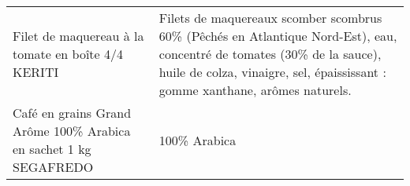 \begin{longtable}{p{5cm}p{10cm}}
                                                       Filet de maquereau à la tomate en boîte 4/4 KERITI &                                                                                                                                                                                                                                                                                                                                                                                                                                                                                                                                                                                                                                                                                                                                                                                                                                   Filets de maquereaux scomber scombrus 60\% (Pêchés en Atlantique Nord-Est), eau, concentré de tomates (30\% de la sauce), huile de colza, vinaigre, sel, épaississant : gomme xanthane, arômes naturels. \\
                                         Café en grains Grand Arôme 100\% Arabica en sachet 1 kg SEGAFREDO &                                                                                                                                                                                                                                                                                                                                                                                                                                                                                                                                                                                                                                                                                                                                                                                                                                                                                                                                                                                                                             100\% Arabica \\

\end{longtable}
